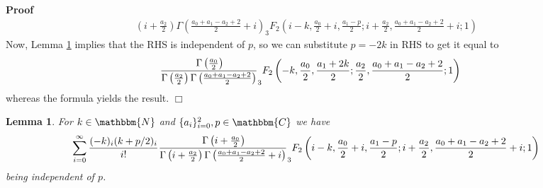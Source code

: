 \documentclass{article}
\renewenvironment{proof}{\noindent\textbf{Proof\ }}{\hspace*{\fill}$\Box$\medskip}
\newtheorem{lemma}[proposition]{Lemma}
\theoremstyle{remark}
\begin{document}
\begin{proof}
\begin{eqnarray}
{    \left( i + \frac{a_2}{2} \right) \Gamma \left( \frac{a_0 + a_1 - a_2 +
    2}{2} + i \right)} _3 F_2 \left( i - k, \frac{a_0}{2} + i, \frac{a_1 -
    p}{2} ; i + \frac{a_2}{2}, \frac{a_0 + a_1 - a_2 + 2}{2} + i ; 1 \right) &
    \nonumber
  \end{eqnarray}
  Now, Lemma \ref{intform:lem-aux} implies that the RHS is independent of $p$,
  so we can substitute $p = - 2 k$ in RHS to get it equal to
  \[ \frac{\hspace{0.17em} \Gamma \left( \frac{a_0}{2} \right)}{\Gamma \left(
     \frac{a_2}{2} \right) \Gamma \left( \frac{a_0 + a_1 - a_2 + 2}{2}
     \right)} _3 F_2 \left( - k, \frac{a_0}{2}, \frac{a_1 + 2 k}{2} ;
     \frac{a_2}{2}, \frac{a_0 + a_1 - a_2 + 2}{2} ; 1 \right) \]
  whereas the formula {\cite[http://dlmf.nist.gov/16.4\#E3]{NIST:DLMF}} yields
  the result.
\end{proof}

\begin{lemma}
  \label{intform:lem-aux}For $k \in \mathbbm{N}$ and $\{ a_i \}_{i = 0}^2, p
  \in \mathbbm{C}$ we have
  \begin{eqnarray}
    & \sum_{i = 0}^{\infty} \frac{(- k)_i (k + p / 2)_i}{i!}
    \frac{\hspace{0.17em} \Gamma \left( i + \frac{a_0}{2} \right)}{\Gamma
    \left( i + \frac{a_2}{2} \right) \Gamma \left( \frac{a_0 + a_1 - a_2 +
    2}{2} + i \right)} _3 F_2 \left( i - k, \frac{a_0}{2} + i, \frac{a_1 -
    p}{2} ; i + \frac{a_2}{2}, \frac{a_0 + a_1 - a_2 + 2}{2} + i ; 1 \right) &
    \nonumber
  \end{eqnarray}
  being independent of $p$.
\end{lemma}
\end{document}

